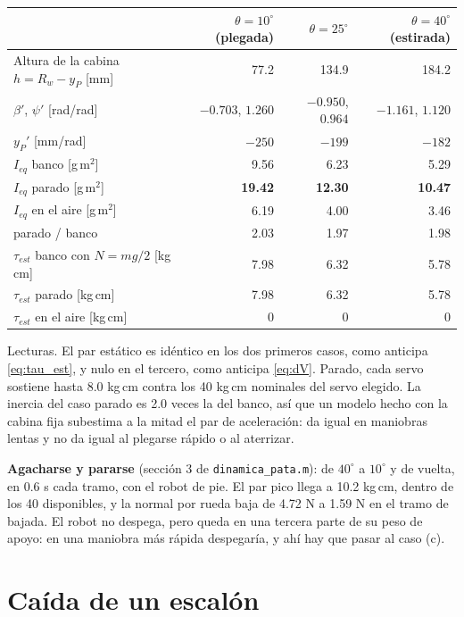 \documentclass[11pt,a4paper]{article}
\begin{document}
\begin{center}\small
\begin{tabular}{lrrr}
\toprule
 & \(\theta=10^\circ\) (plegada) & \(\theta=25^\circ\) & \(\theta=40^\circ\) (estirada) \\
\midrule
Altura de la cabina \(h=R_w-y_P\) [mm] & 77.2 & 134.9 & 184.2 \\
\(\beta'\), \(\psi'\) [rad/rad] & \(-0.703\), \(1.260\) & \(-0.950\), \(0.964\) & \(-1.161\), \(1.120\) \\
\(y_P'\) [mm/rad] & \(-250\) & \(-199\) & \(-182\) \\
\midrule
\(I_{eq}\) banco [g\,m\(^2\)] & 9.56 & 6.23 & 5.29 \\
\(I_{eq}\) parado [g\,m\(^2\)] & \textbf{19.42} & \textbf{12.30} & \textbf{10.47} \\
\(I_{eq}\) en el aire [g\,m\(^2\)] & 6.19 & 4.00 & 3.46 \\
parado / banco & 2.03 & 1.97 & 1.98 \\
\midrule
\(\tau_{est}\) banco con \(N=m g/2\) [kg\,cm] & 7.98 & 6.32 & 5.78 \\
\(\tau_{est}\) parado [kg\,cm] & 7.98 & 6.32 & 5.78 \\
\(\tau_{est}\) en el aire [kg\,cm] & 0 & 0 & 0 \\
\bottomrule
\end{tabular}
\end{center}

Lecturas. El par estático es idéntico en los dos primeros casos, como anticipa \eqref{eq:tau_est}, y nulo en
el tercero, como anticipa \eqref{eq:dV}. Parado, cada servo sostiene hasta 8.0 kg\,cm contra los 40 kg\,cm
nominales del servo elegido. La inercia del caso parado es 2.0 veces la del banco, así que un modelo hecho con la
cabina fija subestima a la mitad el par de aceleración: da igual en maniobras lentas y no da igual al
plegarse rápido o al aterrizar.

\textbf{Agacharse y pararse} (sección 3 de \texttt{dinamica\_pata.m}): de \(40^\circ\) a \(10^\circ\) y de
vuelta, en 0.6 s cada tramo, con el robot de pie. El par pico llega a 10.2 kg\,cm, dentro de los 40
disponibles, y la normal por rueda baja de 4.72 N a 1.59 N en el tramo de bajada. El robot no despega, pero
queda en una tercera parte de su peso de apoyo: en una maniobra más rápida despegaría, y ahí hay que
pasar al caso (c).

\section{Caída de un escalón}
\end{document}
